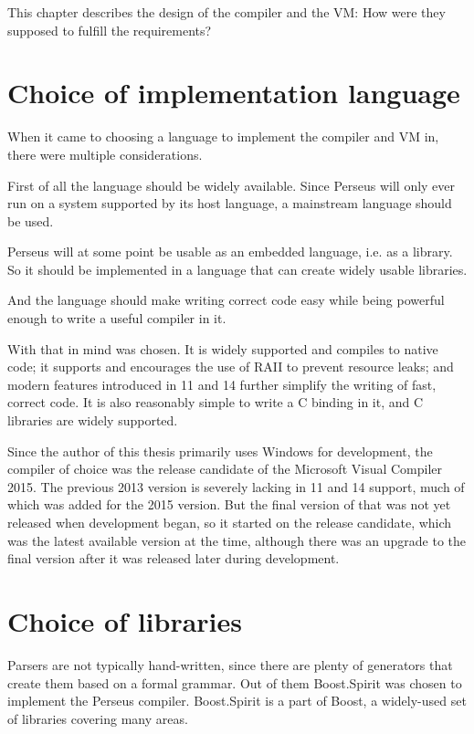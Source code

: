 	This chapter describes the design of the compiler and the VM: How were they supposed to fulfill the requirements?

	\section{Choice of implementation language}
	
		When it came to choosing a language to implement the compiler and VM in, there were multiple considerations.
		
		First of all the language should be widely available. Since Perseus will only ever run on a system supported by its host language, a mainstream language should be used.
		
		Perseus will at some point be usable as an embedded language, i.e. as a library. So it should be implemented in a language that can create widely usable libraries.
		
		And the language should make writing correct code easy while being powerful enough to write a useful compiler in it.
		
		With that in mind {\CC} was chosen. It is widely supported and compiles to native code; it supports and encourages the use of RAII to prevent resource leaks; and modern features introduced in {\CC}11 and {\CC}14 further simplify the writing of fast, correct code\cite{effective-modern-cpp}. It is also reasonably simple to write a C binding in it, and C libraries are widely supported.
		
		Since the author of this thesis primarily uses Windows for development, the compiler of choice was the release candidate of the Microsoft Visual {\CC} Compiler 2015. The previous 2013 version is severely lacking in {\CC}11 and {\CC}14 support, much of which was added for the 2015 version. But the final version of that was not yet released when development began, so it started on the release candidate, which was the latest available version at the time, although there was an upgrade to the final version after it was released later during development.
	
	\section{Choice of libraries}
	
		Parsers are not typically hand-written, since there are plenty of generators that create them based on a formal grammar. Out of them Boost.Spirit was chosen to implement the Perseus compiler. Boost.Spirit is a part of Boost, a widely-used set of {\CC} libraries covering many areas.
		
